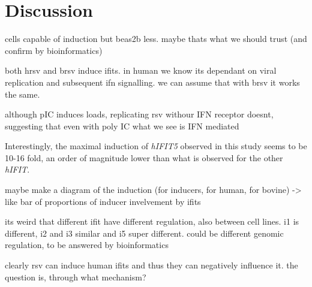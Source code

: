 \section{Discussion} \label{sec:Discussion Chapter 1}


cells capable of induction but beas2b less. maybe thats what we should trust (and confirm by bioinformatics)

both hrsv and brsv induce ifits. in human we know its dependant on viral replication and subsequent ifn signalling. we can assume that with brsv it works the same.

although pIC induces loads, replicating rsv withour IFN receptor doesnt, suggesting that even with poly IC what we see is IFN mediated

Interestingly, the maximal induction of \textit{hIFIT5} observed in this study seems to be 10-16 fold, an order of magnitude lower than what is observed for the other \textit{hIFIT}.


maybe make a diagram of the induction (for inducers, for human, for bovine) -> like bar of proportions of inducer invelvement by ifits

its weird that different ifit have different regulation, also between cell lines. i1 is different, i2 and i3 similar and i5 super different. could be different genomic regulation, to be answered by bioinformatics

clearly rsv can induce human ifits and thus they can negatively influence it. the question is, through what mechanism? 



